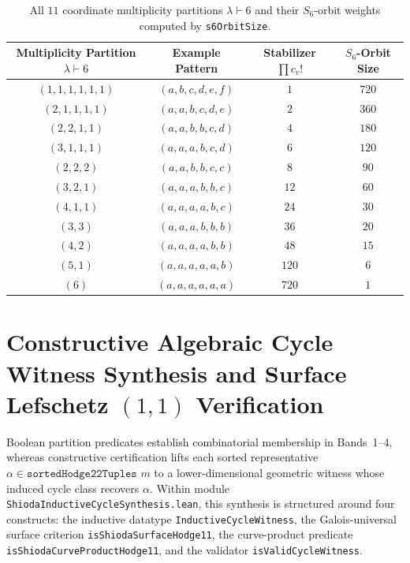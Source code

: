 \documentclass[11pt,a4paper]{article}
\begin{document}
\begin{table}[htbp]
  \centering
  \caption{All $11$ coordinate multiplicity partitions $\lambda \vdash 6$ and their $S_6$-orbit weights computed by \texttt{s6OrbitSize}.}
  \label{tab:s6_partitions}
  \begin{tabular}{cccc}
    \toprule
    Multiplicity Partition $\lambda \vdash 6$ & Example Pattern & Stabilizer $\prod c_v!$ & $S_6$-Orbit Size \\
    \midrule
    $(1,1,1,1,1,1)$ & $(a,b,c,d,e,f)$ & $1$ & $720$ \\
    $(2,1,1,1,1)$ & $(a,a,b,c,d,e)$ & $2$ & $360$ \\
    $(2,2,1,1)$ & $(a,a,b,b,c,d)$ & $4$ & $180$ \\
    $(3,1,1,1)$ & $(a,a,a,b,c,d)$ & $6$ & $120$ \\
    $(2,2,2)$ & $(a,a,b,b,c,c)$ & $8$ & $90$ \\
    $(3,2,1)$ & $(a,a,a,b,b,c)$ & $12$ & $60$ \\
    $(4,1,1)$ & $(a,a,a,a,b,c)$ & $24$ & $30$ \\
    $(3,3)$ & $(a,a,a,b,b,b)$ & $36$ & $20$ \\
    $(4,2)$ & $(a,a,a,a,b,b)$ & $48$ & $15$ \\
    $(5,1)$ & $(a,a,a,a,a,b)$ & $120$ & $6$ \\
    $(6)$ & $(a,a,a,a,a,a)$ & $720$ & $1$ \\
    \bottomrule
  \end{tabular}
\end{table}

\section{Constructive Algebraic Cycle Witness Synthesis and Surface Lefschetz \texorpdfstring{$(1,1)$}{(1,1)} Verification}

Boolean partition predicates establish combinatorial membership in Bands~1--4, whereas constructive certification lifts each sorted representative $\alpha \in \texttt{sortedHodge22Tuples } m$ to a lower-dimensional geometric witness whose induced cycle class recovers $\alpha$. Within module \texttt{ShiodaInductive\-CycleSynthesis.lean}, this synthesis is structured around four constructs: the inductive datatype \texttt{Inductive\-CycleWitness}, the Galois-universal surface criterion \texttt{isShiodaSurface\-Hodge11}, the curve-product predicate \texttt{isShiodaCurve\-ProductHodge11}, and the validator \texttt{isValid\-CycleWitness}.
\end{document}

